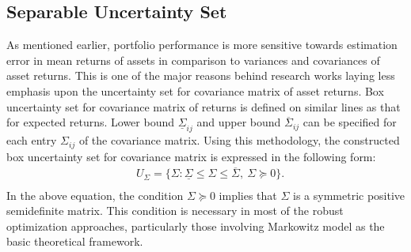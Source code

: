 \subsection{Separable Uncertainty Set}
As mentioned earlier, portfolio performance is more sensitive towards estimation error in mean returns of assets in comparison to variances and covariances of asset returns. This is one of the major reasons behind research works laying less emphasis upon the uncertainty set for covariance matrix of asset returns. Box uncertainty set for covariance matrix of returns is defined on similar lines as that for expected returns. Lower bound $\underline{\Sigma}_{ij}$ and upper bound $\overline{\Sigma}_{ij}$ can be specified for each entry $\Sigma_{ij}$ of the covariance matrix. Using this methodology, the constructed box uncertainty set for covariance matrix is expressed in the following form:
\begin{equation}
\begin{split}
& U_{\Sigma}= \{\Sigma: \underline{\Sigma} \leq \Sigma \leq \overline{\Sigma}, \ \Sigma \succeq 0 \}. \\
\end{split}
\end{equation}
In the above equation, the condition $\Sigma \succeq 0$ implies that $\Sigma$ is a symmetric positive semidefinite matrix. This condition is necessary in most of the robust optimization approaches, particularly those involving Markowitz model as the basic theoretical framework. 

